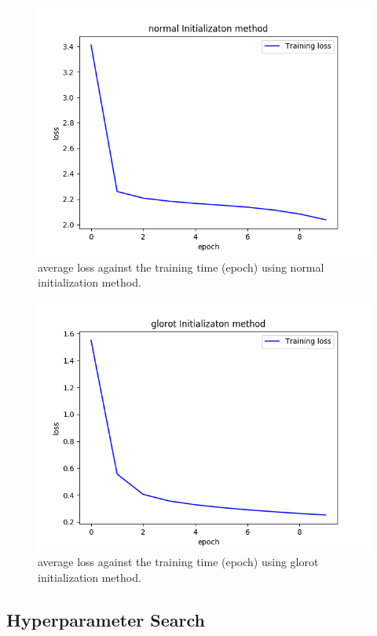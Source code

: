 \documentclass[a4paper]{article}
\begin{document}
\begin{figure}
\centering
\includegraphics[width=1\textwidth]{normal_init.png}
\caption{\label{fig:init2}average loss against the training time (epoch) using normal initialization method.}
\end{figure}

\begin{figure}
\centering
\includegraphics[width=1\textwidth]{glorot_init.png}
\caption{\label{fig:init3}average loss against the training time (epoch) using glorot initialization method.}
\end{figure}

\subsection{Hyperparameter Search}
\end{document}
